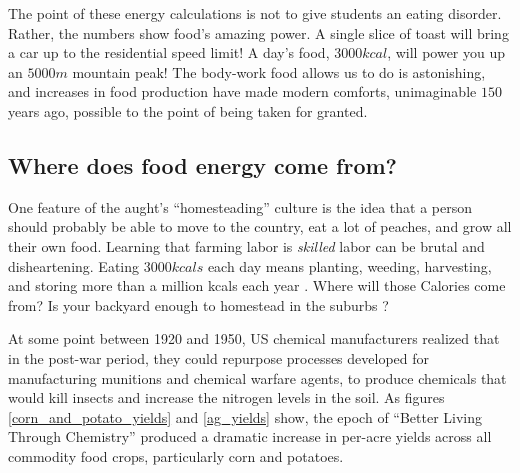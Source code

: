 \documentclass[prb,preprint]{revtex4-2}
\begin{document}
The point of these energy calculations is not to give students an eating disorder.  Rather, the numbers show food's amazing power. A single slice of toast will bring a car up to the residential speed limit!  A day's food, $3000kcal$, will power you up an $5000m$ mountain peak! The body-work food allows us to do is astonishing, and increases in food production have made modern  comforts, unimaginable $150$ years ago, possible to the point of being taken for granted.  

\clearpage

\subsection{Where does food energy come from?}
One feature of the aught's ``homesteading'' culture \cite{homesteading} is the idea that a person should probably be able to move to the country, eat a lot of peaches, and grow all their own food.  Learning that farming labor is \textit{skilled} labor can be brutal and disheartening. Eating $3000kcals$ each day means planting, weeding, harvesting, and storing more than a million kcals each year \cite{Haspel}.  Where will those Calories come from? Is your backyard enough to homestead in the suburbs \cite{backyard_homestead}?

At some point between 1920 and 1950, US chemical manufacturers realized that in the post-war period, they could repurpose processes developed for manufacturing munitions and chemical warfare agents, to produce chemicals that would kill insects and increase the nitrogen levels in the soil. 
As figures \ref{corn_and_potato_yields} and \ref{ag_yields} show, the epoch of ``Better Living Through Chemistry'' produced a dramatic increase in per-acre yields across all commodity food crops, particularly corn and potatoes.  
\end{document}
